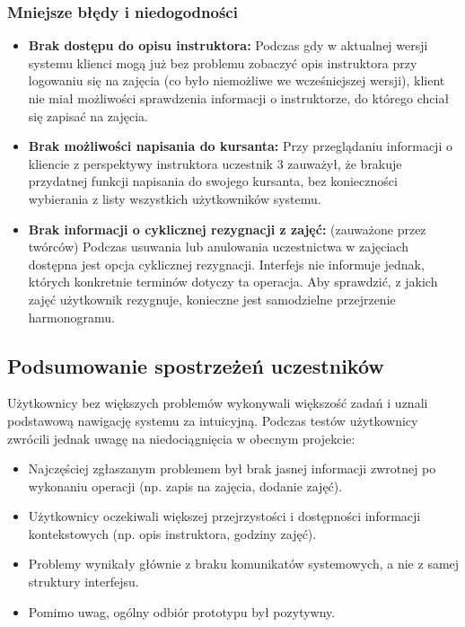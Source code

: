 \documentclass[a4paper,12pt]{article}
\begin{document}
\subsubsection*{Mniejsze błędy i niedogodności}
 
\begin{itemize}
    \item \textbf{Brak dostępu do opisu instruktora:} Podczas gdy w aktualnej wersji systemu klienci mogą już bez problemu zobaczyć opis instruktora przy logowaniu się na zajęcia (co było niemożliwe we wcześniejszej wersji), klient nie miał możliwości sprawdzenia informacji o instruktorze, do którego chciał się zapisać na zajęcia.
 
    \item \textbf{Brak możliwości napisania do kursanta:} Przy przeglądaniu informacji o kliencie z perspektywy instruktora uczestnik 3 zauważył, że brakuje przydatnej funkcji napisania do swojego kursanta, bez konieczności wybierania z listy wszystkich użytkowników systemu.
 
    \item \textbf{Brak informacji o cyklicznej rezygnacji z zajęć:} (zauważone przez twórców) Podczas usuwania lub anulowania uczestnictwa w zajęciach dostępna jest opcja cyklicznej rezygnacji. Interfejs nie informuje jednak, których konkretnie terminów dotyczy ta operacja. Aby sprawdzić, z jakich zajęć użytkownik rezygnuje, konieczne jest samodzielne przejrzenie harmonogramu.
\end{itemize}
 
\subsection{Podsumowanie spostrzeżeń uczestników}
 
Użytkownicy bez większych problemów wykonywali większość zadań i uznali podstawową nawigację systemu za intuicyjną. Podczas testów użytkownicy zwrócili jednak uwagę na niedociągnięcia w obecnym projekcie:
 
\begin{itemize}
    \item Najczęściej zgłaszanym problemem był brak jasnej informacji zwrotnej po wykonaniu operacji (np. zapis na zajęcia, dodanie zajęć).
    \item Użytkownicy oczekiwali większej przejrzystości i dostępności informacji kontekstowych (np. opis instruktora, godziny zajęć).
    \item Problemy wynikały głównie z braku komunikatów systemowych, a nie z samej struktury interfejsu.
    \item Pomimo uwag, ogólny odbiór prototypu był pozytywny.
\end{itemize}
 
\end{document}
